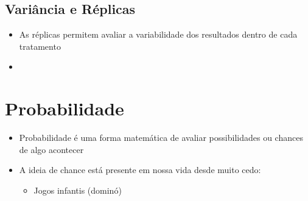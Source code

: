 \documentclass[12pt]{article}
\begin{document}
    \subsection{Variância e Réplicas}
    \begin{itemize}
        \item As réplicas permitem avaliar a variabilidade dos resultados dentro 
        de cada tratamento
        \item 
    \end{itemize}


\section{Probabilidade}
\begin{itemize}
    \item Probabilidade é uma forma matemática de avaliar possibilidades ou 
    chances de algo acontecer
    \item A ideia de chance está presente em nossa vida desde muito cedo:
    \begin{itemize}
        \item Jogos infantis (dominó)
    \end{itemize}
\end{itemize}
\end{document}
